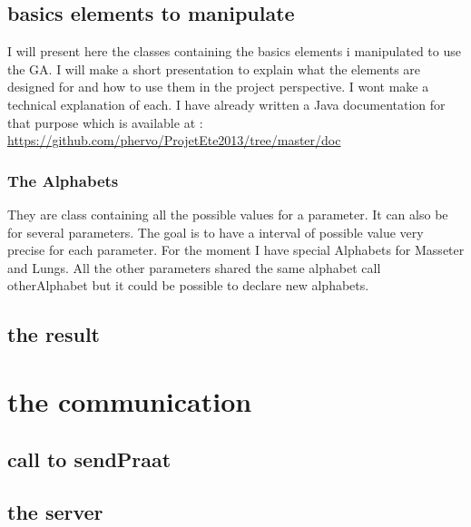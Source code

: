 \documentclass[12pt]{report}
\begin{document}
\section{basics elements to manipulate}
I will present here the classes containing the basics elements i manipulated to use the GA.
I will make a short presentation to explain what the elements are designed for and how to use them in the project perspective. I wont make a technical explanation of each. I have already written a Java documentation for that purpose which is available at : \url{https://github.com/phervo/ProjetEte2013/tree/master/doc}

\subsection{The Alphabets}
They are class containing all the possible values for a parameter. It can also be for several parameters.
The goal is to have a interval of possible value very precise for each parameter.
For the moment I have  special Alphabets for Masseter and Lungs. All the other parameters shared the same alphabet call otherAlphabet but it could be possible to declare new alphabets.

\section{the result}

\chapter{the communication}
\section{call to sendPraat}
\section{the server}

\listoffigures
\listoftables

 
\end{document}
